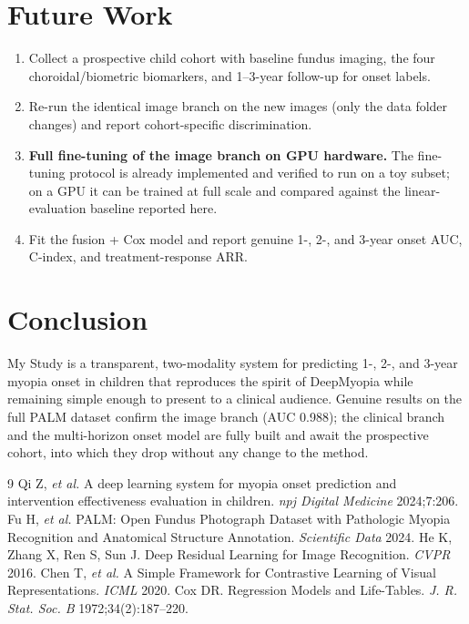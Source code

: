\documentclass[11pt]{article}
\begin{document}
\section{Future Work}\label{sec:future}
\begin{enumerate}[leftmargin=1.4em,itemsep=1pt]
  \item Collect a prospective child cohort with baseline fundus imaging, the four
  choroidal/biometric biomarkers, and 1--3-year follow-up for onset labels.
  \item Re-run the identical image branch on the new images (only the data folder
  changes) and report cohort-specific discrimination.
  \item \textbf{Full fine-tuning of the image branch on GPU hardware.} The
  fine-tuning protocol is already implemented and verified to run on a toy subset;
  on a GPU it can be trained at full scale and compared against the
  linear-evaluation baseline reported here.
  \item Fit the fusion + Cox model and report genuine 1-, 2-, and 3-year onset AUC,
  C-index, and treatment-response ARR.
\end{enumerate}

\section{Conclusion}
My Study is a transparent, two-modality system for predicting 1-, 2-, and 3-year
myopia onset in children that reproduces the spirit of DeepMyopia while remaining
simple enough to present to a clinical audience. Genuine results on the full PALM
dataset confirm the image branch (AUC 0.988); the clinical branch and the
multi-horizon onset model are fully built and await the prospective cohort, into
which they drop without any change to the method.

\begin{thebibliography}{9}
 Qi Z, \emph{et al.} A deep learning system for myopia onset
prediction and intervention effectiveness evaluation in children.
\emph{npj Digital Medicine} 2024;7:206.
 Fu H, \emph{et al.} PALM: Open Fundus Photograph Dataset with
Pathologic Myopia Recognition and Anatomical Structure Annotation.
\emph{Scientific Data} 2024.
 He K, Zhang X, Ren S, Sun J. Deep Residual Learning for Image
Recognition. \emph{CVPR} 2016.
 Chen T, \emph{et al.} A Simple Framework for Contrastive Learning
of Visual Representations. \emph{ICML} 2020.
 Cox DR. Regression Models and Life-Tables. \emph{J. R. Stat. Soc. B}
1972;34(2):187--220.
\end{thebibliography}
\end{document}
